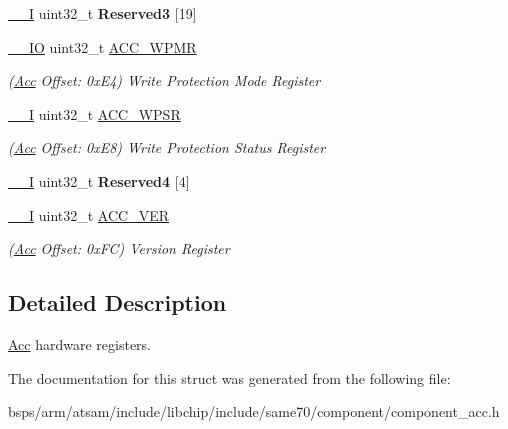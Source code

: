 \begin{DoxyCompactItemize}
\mbox{\label{structAcc_aac8b59fab8ea00f3cc1a5804c6095ba9}} 
\mbox{\hyperlink{core__cm7_8h_af63697ed9952cc71e1225efe205f6cd3}{\+\_\+\+\_\+I}} uint32\+\_\+t {\bfseries Reserved3} \mbox{[}19\mbox{]}
\item 
\mbox{\label{structAcc_a1b299418a8f4a93fece2b135f6189643}} 
\mbox{\hyperlink{core__cm7_8h_aec43007d9998a0a0e01faede4133d6be}{\+\_\+\+\_\+\+IO}} uint32\+\_\+t \mbox{\hyperlink{structAcc_a1b299418a8f4a93fece2b135f6189643}{A\+C\+C\+\_\+\+W\+P\+MR}}
\begin{DoxyCompactList}\small\item\em (\mbox{\hyperlink{structAcc}{Acc}} Offset\+: 0x\+E4) Write Protection Mode Register \end{DoxyCompactList}\item 
\mbox{\label{structAcc_a1bb6d743bccef2068b3107283c8d1b0c}} 
\mbox{\hyperlink{core__cm7_8h_af63697ed9952cc71e1225efe205f6cd3}{\+\_\+\+\_\+I}} uint32\+\_\+t \mbox{\hyperlink{structAcc_a1bb6d743bccef2068b3107283c8d1b0c}{A\+C\+C\+\_\+\+W\+P\+SR}}
\begin{DoxyCompactList}\small\item\em (\mbox{\hyperlink{structAcc}{Acc}} Offset\+: 0x\+E8) Write Protection Status Register \end{DoxyCompactList}\item 
\mbox{\label{structAcc_a2b1f49581909e7f1d34168a8f24e38f4}} 
\mbox{\hyperlink{core__cm7_8h_af63697ed9952cc71e1225efe205f6cd3}{\+\_\+\+\_\+I}} uint32\+\_\+t {\bfseries Reserved4} \mbox{[}4\mbox{]}
\item 
\mbox{\label{structAcc_a89ccdcff0886f7663c4f8a0437913bf5}} 
\mbox{\hyperlink{core__cm7_8h_af63697ed9952cc71e1225efe205f6cd3}{\+\_\+\+\_\+I}} uint32\+\_\+t \mbox{\hyperlink{structAcc_a89ccdcff0886f7663c4f8a0437913bf5}{A\+C\+C\+\_\+\+V\+ER}}
\begin{DoxyCompactList}\small\item\em (\mbox{\hyperlink{structAcc}{Acc}} Offset\+: 0x\+FC) Version Register \end{DoxyCompactList}\end{DoxyCompactItemize}


\subsection{Detailed Description}
\mbox{\hyperlink{structAcc}{Acc}} hardware registers. 

The documentation for this struct was generated from the following file\+:\begin{DoxyCompactItemize}
\item 
bsps/arm/atsam/include/libchip/include/same70/component/component\+\_\+acc.\+h\end{DoxyCompactItemize}
